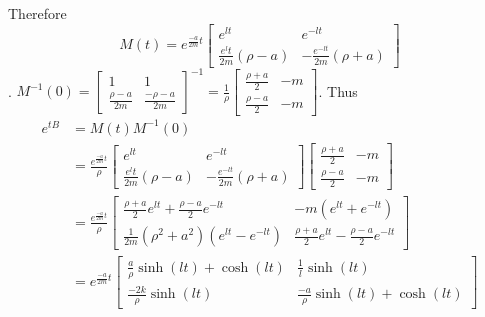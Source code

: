 \documentclass[12pt, letterpaper]{article}
\begin{document}
\begin{enumerate}
\begin{enumerate}
\begin{itemize}
			Therefore 
			$$
			M(t) = e^{\frac{-a}{2m}t} \begin{bmatrix}
			e^{lt} & e^{-lt}\\
			\frac{e^lt}{2m}(\rho - a) & -\frac{e^{-lt}}{2m} (\rho + a)
\end{bmatrix}						
			$$.
			$M^{-1}(0) = \begin{bmatrix}1 & 1\\ \frac{\rho -a}{2m} & \frac{-\rho -a}{2m}	\end{bmatrix}^{-1} = \frac{1}{\rho} \begin{bmatrix} \frac{\rho + a}{2} & -m\\  \frac{\rho - a}{2} & -m \end{bmatrix} $.
			Thus 
			\begin{align*}
			e^{tB} &= M(t)M^{-1}(0)\\
			&= \frac{e^{\frac{-a}{2m}t}}{\rho} \begin{bmatrix}
			e^{lt} & e^{-lt}\\
			\frac{e^lt}{2m}(\rho - a) & -\frac{e^{-lt}}{2m} (\rho + a)
\end{bmatrix} \begin{bmatrix} \frac{\rho + a}{2} & -m\\  \frac{\rho - a}{2} & -m \end{bmatrix}\\
&= \frac{e^{\frac{-a}{2m}t}}{\rho} \begin{bmatrix}
\frac{\rho + a}{2} e^{lt} + \frac{\rho - a}{2}e^{-lt} & -m(e^{lt} + e^{-lt})\\ \frac{1}{2m}(\rho^2 + a^2)(e^{lt} - e^{-lt}) & \frac{\rho + a}{2} e^{lt} - \frac{\rho - a}{2}e^{-lt}
\end{bmatrix}\\
	&= e^{\frac{-a}{2m}t} \begin{bmatrix}
	\frac{a}{\rho} \sinh(lt) + \cosh(lt) & \frac{1}{l} \sinh(lt)\\ \frac{-2k}{\rho} \sinh(lt) & \frac{-a}{\rho} \sinh(lt) + \cosh(lt)
	\end{bmatrix}
			\end{align*}
			\end{itemize}
		

\end{enumerate}
\end{enumerate}
\end{document}
